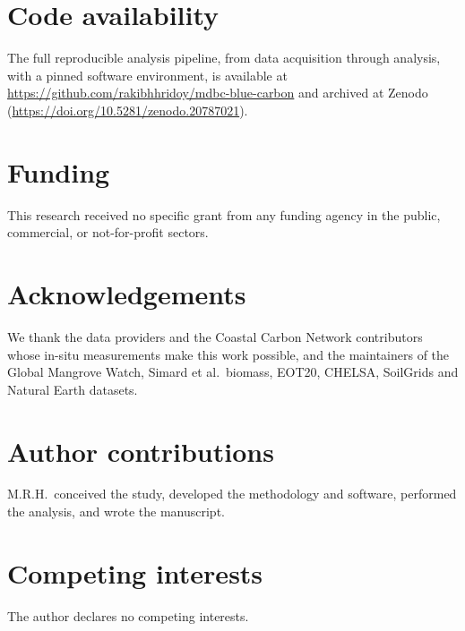 \documentclass[11pt]{article}
\begin{document}
\section*{Code availability}
The full reproducible analysis pipeline, from data acquisition through analysis, with a
pinned software environment, is available at
\url{https://github.com/rakibhhridoy/mdbc-blue-carbon} and archived at Zenodo
(\url{https://doi.org/10.5281/zenodo.20787021}).

\section*{Funding}
This research received no specific grant from any funding agency in the public,
commercial, or not-for-profit sectors.

\section*{Acknowledgements}
We thank the data providers and the Coastal Carbon Network contributors whose in-situ
measurements make this work possible, and the maintainers of the Global Mangrove Watch,
Simard et al.\ biomass, EOT20, CHELSA, SoilGrids and Natural Earth datasets.

\section*{Author contributions}
M.R.H.\ conceived the study, developed the methodology and software, performed the
analysis, and wrote the manuscript.

\section*{Competing interests}
The author declares no competing interests.



\end{document}
